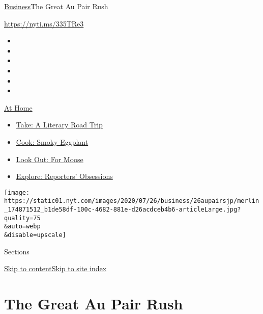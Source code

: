 \href{/section/business}{Business}\textbar{}The Great Au Pair Rush

\url{https://nyti.ms/335TRe3}

\begin{itemize}
\item
\item
\item
\item
\item
\item
\end{itemize}

\href{https://www.nytimes.com/spotlight/at-home?action=click\&pgtype=Article\&state=default\&region=TOP_BANNER\&context=at_home_menu}{At
Home}

\begin{itemize}
\tightlist
\item
  \href{https://www.nytimes.com/2020/07/28/books/time-for-a-literary-road-trip.html?action=click\&pgtype=Article\&state=default\&region=TOP_BANNER\&context=at_home_menu}{Take:
  A Literary Road Trip}
\item
  \href{https://www.nytimes.com/2020/07/29/magazine/bored-with-your-home-cooking-some-smoky-eggplant-will-fix-that.html?action=click\&pgtype=Article\&state=default\&region=TOP_BANNER\&context=at_home_menu}{Cook:
  Smoky Eggplant}
\item
  \href{https://www.nytimes.com/2020/07/27/travel/moose-michigan-isle-royale.html?action=click\&pgtype=Article\&state=default\&region=TOP_BANNER\&context=at_home_menu}{Look
  Out: For Moose}
\item
  \href{https://www.nytimes.com/interactive/2020/at-home/even-more-reporters-editors-diaries-lists-recommendations.html?action=click\&pgtype=Article\&state=default\&region=TOP_BANNER\&context=at_home_menu}{Explore:
  Reporters' Obsessions}
\end{itemize}

\texttt{[image: https://static01.nyt.com/images/2020/07/26/business/26aupairsjp/merlin\_174871512\_b1de58df-100c-4682-881e-d26acdceb4b6-articleLarge.jpg?quality=75\\\&auto=webp\\\&disable=upscale]}

Sections

\protect\hyperlink{site-content}{Skip to
content}\protect\hyperlink{site-index}{Skip to site index}

\hypertarget{the-great-au-pair-rush}{%
\section{The Great Au Pair Rush}\label{the-great-au-pair-rush}}

